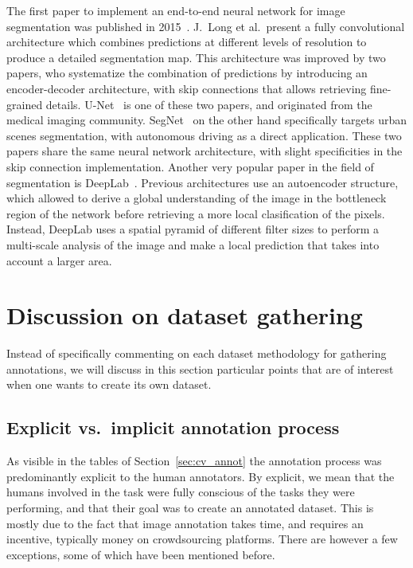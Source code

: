 The first paper to implement an end-to-end neural network
for image segmentation was published in 2015~\cite{long2015fully}.
J.\ Long et al.\ present a fully convolutional architecture which combines
predictions at different levels of resolution to produce a detailed segmentation map.
This architecture was improved by two papers,
who systematize the combination of predictions by introducing
an encoder-decoder architecture,
with skip connections that allows retrieving fine-grained details.
U-Net~\cite{ronneberger2015u} is one of these two papers,
and originated from the medical imaging community.
SegNet~\cite{badrinarayanan2017segnet} on the other hand
specifically targets urban scenes segmentation,
with autonomous driving as a direct application.
These two papers share the same neural network architecture,
with slight specificities in the skip connection implementation.
Another very popular paper in the field of segmentation is DeepLab~\cite{chen2017deeplab}.
Previous architectures use an autoencoder structure,
which allowed to derive a global understanding of the image
in the bottleneck region of the network before retrieving
a more local clasification of the pixels.
Instead, DeepLab uses a spatial pyramid of different filter sizes
to perform a multi-scale analysis of the image and
make a local prediction that takes into account a larger area.

\section{Discussion on dataset gathering}

Instead of specifically commenting on each dataset methodology
for gathering annotations, we will discuss in this section
particular points that are of interest when one wants to create its own dataset.

\subsection{Explicit vs.\ implicit annotation process}

As visible in the tables of Section~\ref{sec:cv_annot}
the annotation process was predominantly explicit to the human annotators.
By explicit, we mean that the humans involved in the task
were fully conscious of the tasks they were performing,
and that their goal was to create an annotated dataset.
This is mostly due to the fact that image annotation takes time,
and requires an incentive, typically money on crowdsourcing platforms.
There are however a few exceptions, some of which have been mentioned before.


